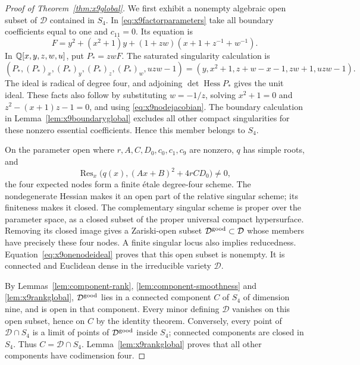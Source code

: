 \begin{proof}[Proof of Theorem~\ref{thm:x9global}]
We first exhibit a nonempty algebraic open subset of $\mathcal D$
contained in $S_4$. In \eqref{eq:x9factorparameters} take all boundary
coefficients equal to one and $c_{11}=0$. Its equation is
\[
 F=y^2+(x^2+1)y+(1+zw)(x+1+z^{-1}+w^{-1}).
\]
In $\mathbb Q[x,y,z,w,u]$, put $P_*=zwF$. The saturated singularity calculation is
\begin{equation}\label{eq:x9onenodeideal}
 (P_*,(P_*)_x,(P_*)_y,(P_*)_z,(P_*)_w,uzw-1)
   =(y,x^2+1,z+w-x-1,zw+1,uzw-1).
\end{equation}
The ideal is radical of degree four, and adjoining
$\det\operatorname{Hess}P_*$ gives the unit ideal. These facts also
follow by substituting $w=-1/z$, solving $x^2+1=0$ and
$z^2-(x+1)z-1=0$, and using \eqref{eq:x9nodejacobian}.
The boundary calculation in Lemma~\ref{lem:x9boundaryglobal} excludes
all other compact singularities for these nonzero essential
coefficients. Hence this member belongs to $S_4$.

On the parameter open where $r,A,C,D_0,c_0,c_1,c_9$ are nonzero,
$q$ has simple roots, and
\[
 \operatorname{Res}_x\bigl(q(x),(Ax+B)^2+4rCD_0\bigr)\ne0,
\]
the four expected nodes form a finite \'{e}tale degree-four scheme.
The nondegenerate Hessian makes it an open part of the relative singular
scheme; its finiteness makes it closed. The complementary singular
scheme is proper over the parameter space, as a closed subset of the
proper universal compact hypersurface. Removing its closed image gives
a Zariski-open subset $\mathcal D^{\rm good}\subset\mathcal D$ whose
members have precisely these four nodes. A finite singular locus also
implies reducedness. Equation~\eqref{eq:x9onenodeideal} proves that
this open subset is nonempty. It is connected and Euclidean dense in
the irreducible variety $\mathcal D$.

By Lemmas~\ref{lem:component-rank}, \ref{lem:component-smoothness} and
\ref{lem:x9rankglobal}, $\mathcal D^{\rm good}$ lies in a connected
component $C$ of $S_4$ of dimension nine, and is open in that component.
Every minor defining $\mathcal D$ vanishes on this open subset, hence
on $C$ by the identity theorem. Conversely, every point of
$\mathcal D\cap S_4$ is a limit of points of $\mathcal D^{\rm good}$
inside $S_4$; connected components are closed in $S_4$. Thus
$C=\mathcal D\cap S_4$. Lemma~\ref{lem:x9rankglobal} proves that all
other components have codimension four.


\end{proof}
